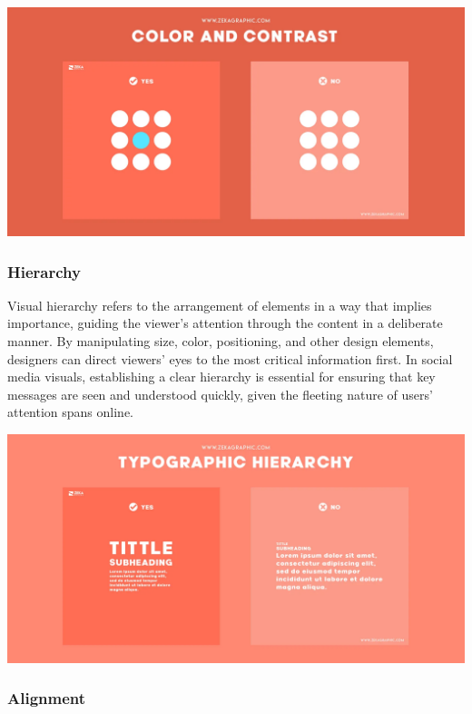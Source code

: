 \documentclass[
]{book}
\begin{document}
\href{https://www.zekagraphic.com/visual-hierarchy-graphic-design-principles/}{\includegraphics[width=1\textwidth,height=\textheight]{images/clipboard-2970953759.png}}

\hypertarget{hierarchy}{%
\subsubsection*{Hierarchy}\label{hierarchy}}

Visual hierarchy refers to the arrangement of elements in a way that implies importance, guiding the viewer's attention through the content in a deliberate manner. By manipulating size, color, positioning, and other design elements, designers can direct viewers' eyes to the most critical information first. In social media visuals, establishing a clear hierarchy is essential for ensuring that key messages are seen and understood quickly, given the fleeting nature of users' attention spans online.

\href{https://www.zekagraphic.com/visual-hierarchy-graphic-design-principles/}{\includegraphics[width=1\textwidth,height=\textheight]{images/clipboard-3530120539.png}}

\hypertarget{alignment}{%
\subsubsection*{Alignment}\label{alignment}}
\end{document}
